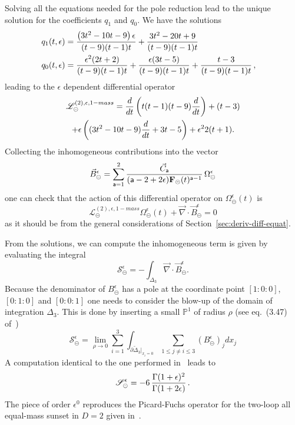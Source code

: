 \documentclass[a4paper,12pt]{article}
\newcommand\lNote[1]{
	\todo[backgroundcolor=red!20!white,fancyline,
	bordercolor=white]{ LDLC:  #1}}
\numberwithin{equation}{section}
\numberwithin{figure}{section}
\def\su{\circleddash}
\begin{document}
%
Solving all the equations needed for the pole reduction lead
to the unique solution for the coefficients $q_1$ and $q_0$. 
We have the solutions
\begin{align}
  q_1(t,\epsilon)&=\frac{\left(3 t^2-10 t-9\right) \epsilon }{(t-9) (t-1) t}+\frac{3 t^2-20 t+9}{(t-9) (t-1)
   t}\cr
  q_0(t,\epsilon)&=\frac{\epsilon ^2 (2 t+2)}{(t-9) (t-1) t}+\frac{\epsilon  (3 t-5)}{(t-9) (t-1)
   t}+\frac{t-3}{(t-9) (t-1) t} \, ,
\end{align}
leading to the $\epsilon$ dependent \lNote{nomenclature} differential operator
\begin{multline}
  \label{e:PF2sunset1massepsilon}
     \mathscr{L}^{(2),\epsilon,1-mass}_\su ={d\over dt}\left( t(t-1)(t-9)
       {d\over dt}\right)+(t-3)\cr+\epsilon\left((3t^2-10t-9) {d\over
         dt}+3t-5\right)
     +\epsilon^2 2(t+1).
\end{multline}
%
Collecting the inhomogeneous contributions into the vector
\begin{equation}
  \vec B_\su^\epsilon=\sum_{\mathsf{a}=1}^2 {\vec C_{\mathsf{a}}\over
    (\mathsf{a}-2+2\epsilon)\textbf{F}_\su(t)^{\mathsf{a}-1}}\, \Omega_\su^\epsilon
\end{equation}
one can check that the action of this differential operator on
$\Omega_{\su}^\epsilon(t)$ is
\begin{equation}
      \mathscr{L}^{(2),\epsilon,1-mass}_\su
      \Omega_{\su}^\epsilon(t)+\vec\nabla \cdot\vec B_\su^\epsilon=0
    \end{equation}
as it should be from the general considerations of Section~\ref{sec:deriv-diff-equat}.


\medskip
From the solutions, we can compute the  inhomogeneous term is given by evaluating the integral 
\begin{equation}
  \mathscr{S}_\su^\epsilon
  =-\int_{\Delta_3} \vec\nabla\cdot\vec B^\epsilon_\su.
\end{equation}
%
Because the denominator of $ B^\epsilon_\su$ has a pole at the coordinate
point $[1:0:0]$, $[0:1:0]$ and $[0:0:1]$ one needs to consider the
blow-up  of the domain of integration $\Delta_3$. This is done by inserting a small
$\mathbb P^1$ of radius $\rho$ (see eq.~(3.47) of~\cite{Bloch:2016izu})
\begin{equation}
    \mathscr{S}_\su^\epsilon=\lim_{\rho\to0} \sum_{i=1}^3
    \int_{\partial\tilde\Delta_3|_{x_i=0}} \sum_{1\leq j\neq i\leq 3}
    (B^\epsilon_\su)_j dx_j
\end{equation}
A computation identical to the one performed in~\cite{Bloch:2016izu} leads to
\begin{equation}
 \mathscr{S}_\su^\epsilon=  -6 \, {\Gamma(1+\epsilon)^2\over \Gamma(1+2\epsilon)} \, . 
\end{equation}
The piece of order $\epsilon^0$ reproduces the Picard-Fuchs operator
for the two-loop all equal-mass sunset in $D=2$ given
in~\cite{Bloch:2013tra,Bloch:2013tra,Vanhove:2014wqa,Bonisch:2020qmm,Pogel:2022vat}.
\end{document}
